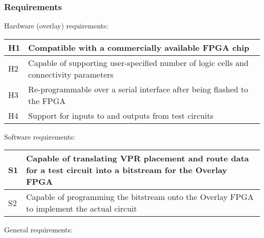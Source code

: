 \subsubsection{Requirements}

Hardware (overlay) requirements:

\begin{tabular}{|p{1cm}|p{15cm}|}
\hline
H1 & Compatible with a commercially available FPGA chip\\ \hline
H2 & Capable of supporting user-specified number of logic cells and connectivity parameters \\ \hline
H3 & Re-programmable over a serial interface after being flashed to the FPGA \\ \hline
H4 & Support for inputs to and outputs from test circuits \\ \hline
\end{tabular}


Software requirements:

\begin{tabular}{|p{1cm}|p{15cm}|}
\hline
S1 & Capable of translating VPR placement and route data for a test circuit into a bitstream for the Overlay FPGA\\ \hline
S2 & Capable of programming the bitstream onto the Overlay FPGA to implement the actual circuit \\ \hline
\end{tabular}


General requirements:

